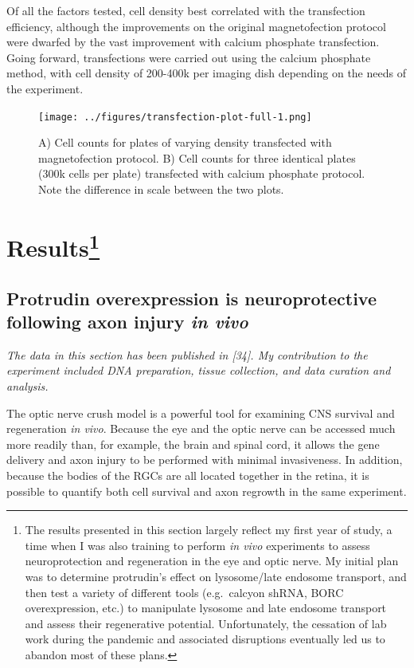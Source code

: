 \documentclass[
  12pt,
  a4paper,
]{book}
\begin{document}
Of all the factors tested, cell density best correlated with the transfection efficiency, although the improvements on the original magnetofection protocol were dwarfed by the vast improvement with calcium phosphate transfection. Going forward, transfections were carried out using the calcium phosphate method, with cell density of 200-400k per imaging dish depending on the needs of the experiment.

\begin{figure}
\centering
\texttt{[image: ../figures/transfection-plot-full-1.png]}
\caption{\label{fig:transfection-plot-full}A) Cell counts for plates of varying density transfected with magnetofection protocol. B) Cell counts for three identical plates (300k cells per plate) transfected with calcium phosphate protocol. Note the difference in scale between the two plots.}
\end{figure}

\hypertarget{results}{%
\section[Results]{\texorpdfstring{Results\footnote{The results presented in this section largely reflect my first year of study, a time when I was also training to perform \emph{in vivo} experiments to assess neuroprotection and regeneration in the eye and optic nerve. My initial plan was to determine protrudin's effect on lysosome/late endosome transport, and then test a variety of different tools (e.g.~calcyon shRNA, BORC overexpression, etc.) to manipulate lysosome and late endosome transport and assess their regenerative potential. Unfortunately, the cessation of lab work during the pandemic and associated disruptions eventually led us to abandon most of these plans.}}{Results}}\label{results}}

\hypertarget{protrudin-ONC}{%
\subsection{\texorpdfstring{Protrudin overexpression is neuroprotective following axon injury \emph{in vivo}}{Protrudin overexpression is neuroprotective following axon injury in vivo}}\label{protrudin-ONC}}

\emph{The data in this section has been published in {[}34{]}. My contribution to the experiment included DNA preparation, tissue collection, and data curation and analysis.}

The optic nerve crush model is a powerful tool for examining CNS survival and regeneration \emph{in vivo}. Because the eye and the optic nerve can be accessed much more readily than, for example, the brain and spinal cord, it allows the gene delivery and axon injury to be performed with minimal invasiveness. In addition, because the bodies of the RGCs are all located together in the retina, it is possible to quantify both cell survival and axon regrowth in the same experiment.
\end{document}
